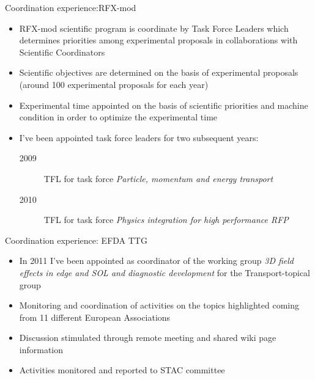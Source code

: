 \documentclass[t,10pt]{beamer}
\begin{document}
\begin{frame}{Coordination experience:RFX-mod}
\begin{itemize}[<+->]
\item RFX-mod scientific program is coordinate by Task Force Leaders which determines
  priorities among experimental proposals in collaborations with
  Scientific Coordinators
\item Scientific objectives are determined on the basis of
  experimental proposals (around 100 experimental proposals for each year)
\item Experimental time appointed on the basis of scientific
  priorities and machine condition in order to optimize the
  experimental time
\item I've been appointed task force leaders for two subsequent years:
  \begin{description}
  \item[2009] TFL for task force \emph{Particle, momentum and energy transport}
  \item[2010] TFL for task force \emph{Physics integration for high
      performance RFP}
  \end{description}
\end{itemize} 
\end{frame}


\begin{frame}{Coordination experience: EFDA TTG}
  \begin{itemize}[<+->]
\item In 2011 I've been appointed as coordinator of the working group
  \emph{3D field effects in edge and SOL and diagnostic development}
  for the Transport-topical group
\item Monitoring and coordination of activities on the topics
  highlighted coming from 11 different European Associations
\item Discussion stimulated through remote meeting and shared wiki
  page information
\item Activities monitored and reported to STAC committee 
\end{itemize} 
\end{frame}
\end{document}
